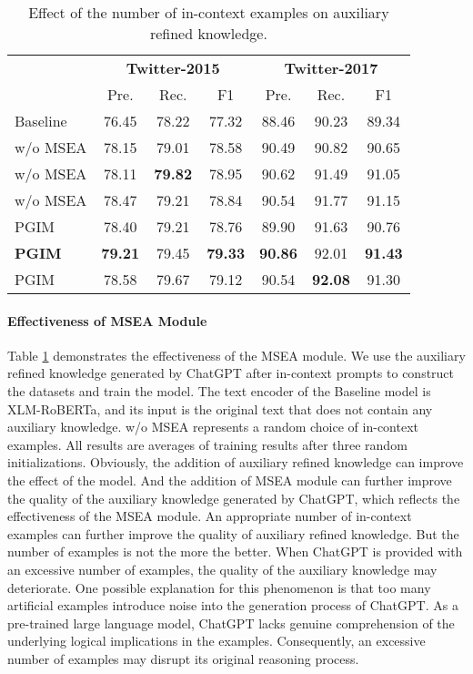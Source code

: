 \documentclass[11pt]{article}
\begin{document}
\begin{table}[t!]
\small
\setlength\tabcolsep{2.6pt}
\renewcommand{\arraystretch}{1.2}
\centering
\begin{tabular}{l|cccccc}
\toprule
& \multicolumn{3}{c|}{\textbf{Twitter-2015}} & \multicolumn{3}{c}{\textbf{Twitter-2017}}\\
& Pre. & Rec. & \multicolumn{1}{c|}{F1}  & Pre. & Rec. & \multicolumn{1}{c}{F1}    \\
\midrule
Baseline      & 76.45  & 78.22 & \multicolumn{1}{c|}{77.32}  & 88.46  & 90.23 & 89.34  \\\midrule
w/o MSEA     & 78.15  & 79.01 & \multicolumn{1}{c|}{78.58}  & 90.49  & 90.82 & 90.65  \\
w/o MSEA     & 78.11  & \textbf{79.82} & \multicolumn{1}{c|}{78.95}  & 90.62  & 91.49 & 91.05  \\
w/o MSEA     & 78.47  & 79.21 & \multicolumn{1}{c|}{78.84}  & 90.54  & 91.77 & 91.15 \\\midrule
PGIM     & 78.40 & 79.21 & \multicolumn{1}{c|}{78.76} & 89.90 & 91.63 & 90.76 \\
\textbf{PGIM}     & \textbf{79.21} & 79.45 & \multicolumn{1}{c|}{\textbf{79.33}} & \textbf{90.86} & 92.01 & \textbf{91.43} \\
PGIM      & 78.58 & 79.67 & \multicolumn{1}{c|}{79.12} & 90.54 & \textbf{92.08} & 91.30 \\
\bottomrule
\end{tabular}
\caption{Effect of the number of in-context examples on auxiliary refined knowledge.}
\label{tab:PGIM ChatGPT4}
\end{table}
\paragraph{Effectiveness of MSEA Module}

Table \ref{tab:PGIM ChatGPT4} demonstrates the effectiveness of the MSEA module. 
We use the auxiliary refined knowledge generated by ChatGPT after  in-context prompts to construct the datasets and train the model. 
The text encoder of the Baseline model is XLM-RoBERTa, and its input is the original text that does not contain any auxiliary knowledge. 
w/o MSEA represents a random choice of in-context examples. All results are averages of training results after three random initializations. 
Obviously, the addition of auxiliary refined knowledge can improve the effect of the model. And the addition of MSEA module can further improve the quality of the auxiliary knowledge generated by ChatGPT, which reflects the effectiveness of the MSEA module. An appropriate number of in-context examples can further improve the quality of auxiliary refined knowledge. 
But the number of examples is not the more the better. When ChatGPT is provided with an excessive number of examples, the quality of the auxiliary knowledge may deteriorate. One possible explanation for this phenomenon is that too many artificial examples introduce noise into the generation process of ChatGPT.
As a pre-trained large language model, ChatGPT lacks genuine comprehension of the underlying logical implications in the examples. Consequently, an excessive number of examples may disrupt its original reasoning process. 
\end{document}
